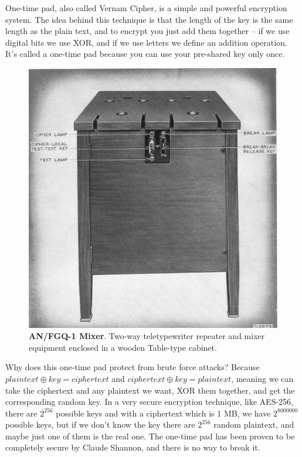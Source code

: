One-time pad, also called Vernam Cipher, is a simple and powerful encryption system. The idea behind this technique is that the length of the key is the same length as the plain text, and to encrypt you just add them together – if we use digital bits we use XOR, and if we use letters we define an addition operation. It’s called a one-time pad because you can use your pre-shared key only once.

\begin{figure}
    \centering
    \includegraphics[width=\textwidth]{images/ch1_Intro/MIxer.jpg}
    \caption{\textbf{AN/FGQ-1 Mixer}. Two-way teletypewriter repeater and mixer equipment enclosed in a wooden Table-type cabinet.}
    \label{fig:Mixer}
\end{figure}

Why does this one-time pad protect from brute force attacks? Because $plaintext \oplus key = ciphertext$ and $ciphertext \oplus key = plaintext$, meaning we can take the ciphertext and any plaintext we want, XOR them together, and get the corresponding random key. In a very secure encryption technique, like AES-256, there are \(2^{256}\) possible keys and with a ciphertext which is 1 MB, we have \(2^{8000000}\) possible keys, but if we don’t know the key there are \(2^{256}\) random plaintext, and maybe just one of them is the real one. The one-time pad has been proven to be completely secure by Claude Shannon, and there is no way to break it.

